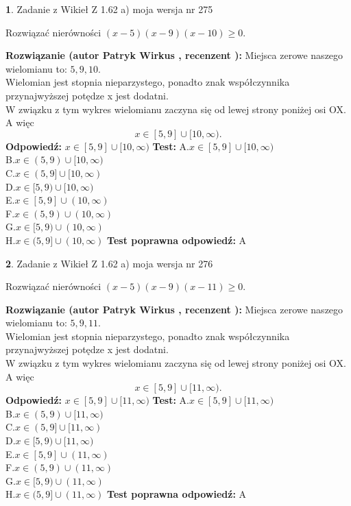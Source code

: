 \documentclass[12pt, a4paper]{article}
\theoremstyle{definition} %
\newtheorem{zad}{}
\newcommand{\zadStart}[1]{\begin{zad}#1\newline}
\newcommand{\zadStop}{\end{zad}}
\newcommand{\rozwStart}[2]{\noindent \textbf{Rozwiązanie (autor #1 , recenzent #2): }\newline}
\newcommand{\rozwStop}{\newline}
\newcommand{\odpStart}{\noindent \textbf{Odpowiedź:}\newline}
\newcommand{\odpStop}{\newline}
\newcommand{\testStart}{\noindent \textbf{Test:}\newline}
\newcommand{\testStop}{\newline}
\newcommand{\kluczStart}{\noindent \textbf{Test poprawna odpowiedź:}\newline}
\newcommand{\kluczStop}{\newline}
\begin{document}
\zadStart{Zadanie z Wikieł Z 1.62 a) moja wersja nr 275}

Rozwiązać nierówności $(x-5)(x-9)(x-10)\ge0$.
\zadStop
\rozwStart{Patryk Wirkus}{}
Miejsca zerowe naszego wielomianu to: $5, 9, 10$.\\
Wielomian jest stopnia nieparzystego, ponadto znak współczynnika przy\linebreak najwyższej potędze x jest dodatni.\\ W związku z tym wykres wielomianu zaczyna się od lewej strony poniżej osi OX. A więc $$x \in [5,9] \cup [10,\infty).$$
\rozwStop
\odpStart
$x \in [5,9] \cup [10,\infty)$
\odpStop
\testStart
A.$x \in [5,9] \cup [10,\infty)$\\
B.$x \in (5,9) \cup [10,\infty)$\\
C.$x \in (5,9] \cup [10,\infty)$\\
D.$x \in [5,9) \cup [10,\infty)$\\
E.$x \in [5,9] \cup (10,\infty)$\\
F.$x \in (5,9) \cup (10,\infty)$\\
G.$x \in [5,9) \cup (10,\infty)$\\
H.$x \in (5,9] \cup (10,\infty)$
\testStop
\kluczStart
A
\kluczStop



\zadStart{Zadanie z Wikieł Z 1.62 a) moja wersja nr 276}

Rozwiązać nierówności $(x-5)(x-9)(x-11)\ge0$.
\zadStop
\rozwStart{Patryk Wirkus}{}
Miejsca zerowe naszego wielomianu to: $5, 9, 11$.\\
Wielomian jest stopnia nieparzystego, ponadto znak współczynnika przy\linebreak najwyższej potędze x jest dodatni.\\ W związku z tym wykres wielomianu zaczyna się od lewej strony poniżej osi OX. A więc $$x \in [5,9] \cup [11,\infty).$$
\rozwStop
\odpStart
$x \in [5,9] \cup [11,\infty)$
\odpStop
\testStart
A.$x \in [5,9] \cup [11,\infty)$\\
B.$x \in (5,9) \cup [11,\infty)$\\
C.$x \in (5,9] \cup [11,\infty)$\\
D.$x \in [5,9) \cup [11,\infty)$\\
E.$x \in [5,9] \cup (11,\infty)$\\
F.$x \in (5,9) \cup (11,\infty)$\\
G.$x \in [5,9) \cup (11,\infty)$\\
H.$x \in (5,9] \cup (11,\infty)$
\testStop
\kluczStart
A
\kluczStop
\end{document}
